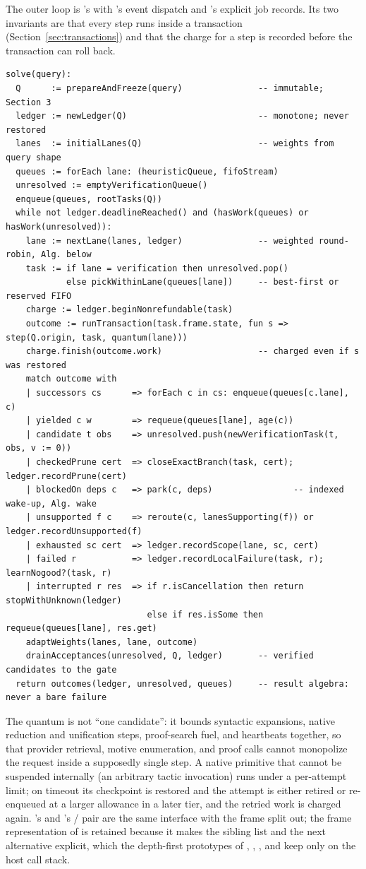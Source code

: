 The outer loop is 's  with 's event dispatch and 's explicit job records. Its two invariants are that every step runs inside a transaction (Section~\ref{sec:transactions}) and that the charge for a step is recorded before the transaction can roll back.
\begin{lstlisting}
solve(query):
  Q      := prepareAndFreeze(query)               -- immutable; Section 3
  ledger := newLedger(Q)                          -- monotone; never restored
  lanes  := initialLanes(Q)                       -- weights from query shape
  queues := forEach lane: (heuristicQueue, fifoStream)
  unresolved := emptyVerificationQueue()
  enqueue(queues, rootTasks(Q))
  while not ledger.deadlineReached() and (hasWork(queues) or hasWork(unresolved)):
    lane := nextLane(lanes, ledger)               -- weighted round-robin, Alg. below
    task := if lane = verification then unresolved.pop()
            else pickWithinLane(queues[lane])     -- best-first or reserved FIFO
    charge := ledger.beginNonrefundable(task)
    outcome := runTransaction(task.frame.state, fun s => step(Q.origin, task, quantum(lane)))
    charge.finish(outcome.work)                   -- charged even if s was restored
    match outcome with
    | successors cs      => forEach c in cs: enqueue(queues[c.lane], c)
    | yielded c w        => requeue(queues[lane], age(c))
    | candidate t obs    => unresolved.push(newVerificationTask(t, obs, v := 0))
    | checkedPrune cert  => closeExactBranch(task, cert); ledger.recordPrune(cert)
    | blockedOn deps c   => park(c, deps)                -- indexed wake-up, Alg. wake
    | unsupported f c    => reroute(c, lanesSupporting(f)) or ledger.recordUnsupported(f)
    | exhausted sc cert  => ledger.recordScope(lane, sc, cert)
    | failed r           => ledger.recordLocalFailure(task, r); learnNogood?(task, r)
    | interrupted r res  => if r.isCancellation then return stopWithUnknown(ledger)
                            else if res.isSome then requeue(queues[lane], res.get)
    adaptWeights(lanes, lane, outcome)
    drainAcceptances(unresolved, Q, ledger)       -- verified candidates to the gate
  return outcomes(ledger, unresolved, queues)     -- result algebra: never a bare failure
\end{lstlisting}
The quantum is not ``one candidate'': it bounds syntactic expansions, native reduction and unification steps, proof-search fuel, and heartbeats together, so that provider retrieval, motive enumeration, and proof calls cannot monopolize the request inside a supposedly single step. A native primitive that cannot be suspended internally (an arbitrary tactic invocation) runs under a per-attempt limit; on timeout its checkpoint is restored and the attempt is either retired or re-enqueued at a larger allowance in a later tier, and the retried work is charged again. 's  and 's / pair are the same interface with the frame split out; the frame representation of  is retained because it makes the sibling list and the next alternative explicit, which the depth-first prototypes of , , , and  keep only on the host call stack.

